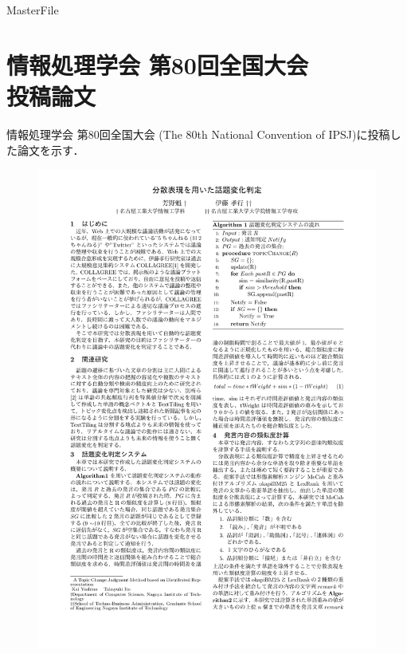 \expandafter\ifx\csname MasterFile\endcsname\relax
\def\SubFile{hoge}


\fi
\cleardoublepage
\chapter[情報処理学会 第80回全国大会 投稿論文]{情報処理学会 第80回全国大会\\投稿論文}
情報処理学会 第80回全国大会 (The 80th National Convention of IPSJ)に投稿した論文を示す．
\begin{figure}
	\centering
	\includegraphics[width=\linewidth,page=1]{../C.IPSJ80/submit.pdf}
\end{figure}

